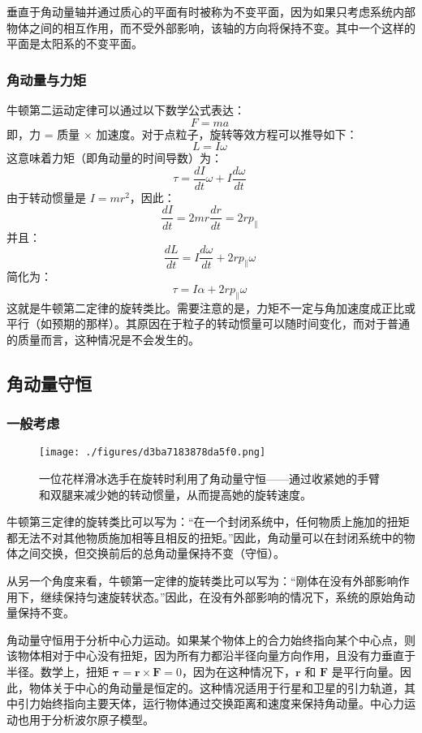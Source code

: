 垂直于角动量轴并通过质心的平面有时被称为不变平面，因为如果只考虑系统内部物体之间的相互作用，而不受外部影响，该轴的方向将保持不变。其中一个这样的平面是太阳系的不变平面。
\subsubsection{角动量与力矩}  
牛顿第二运动定律可以通过以下数学公式表达：
\[ F = ma ~\]
即，力 = 质量 × 加速度。对于点粒子，旋转等效方程可以推导如下：
\[ L = I\omega ~\]
这意味着力矩（即角动量的时间导数）为：
\[ \tau = \frac{dI}{dt} \omega + I\frac{d\omega}{dt} ~\]
由于转动惯量是 \( I = mr^2 \)，因此：
\[ \frac{dI}{dt} = 2mr\frac{dr}{dt} = 2rp_{\parallel} ~\]
并且：
\[ \frac{dL}{dt} = I\frac{d\omega}{dt} + 2rp_{\parallel} \omega ~\]
简化为：
\[ \tau = I\alpha + 2rp_{\parallel} \omega ~\]
这就是牛顿第二定律的旋转类比。需要注意的是，力矩不一定与角加速度成正比或平行（如预期的那样）。其原因在于粒子的转动惯量可以随时间变化，而对于普通的质量而言，这种情况是不会发生的。
\subsection{角动量守恒}
\subsubsection{一般考虑}
\begin{figure}[ht]
\centering
\texttt{[image: ./figures/d3ba7183878da5f0.png]}
\caption{一位花样滑冰选手在旋转时利用了角动量守恒——通过收紧她的手臂和双腿来减少她的转动惯量，从而提高她的旋转速度。} \label{fig_JDL_4}
\end{figure}
牛顿第三定律的旋转类比可以写为：“在一个封闭系统中，任何物质上施加的扭矩都无法不对其他物质施加相等且相反的扭矩。”因此，角动量可以在封闭系统中的物体之间交换，但交换前后的总角动量保持不变（守恒）。

从另一个角度来看，牛顿第一定律的旋转类比可以写为：“刚体在没有外部影响作用下，继续保持匀速旋转状态。”因此，在没有外部影响的情况下，系统的原始角动量保持不变。

角动量守恒用于分析中心力运动。如果某个物体上的合力始终指向某个中心点，则该物体相对于中心没有扭矩，因为所有力都沿半径向量方向作用，且没有力垂直于半径。数学上，扭矩 \(\boldsymbol{\tau} = \mathbf{r} \times \mathbf{F} = 0\)，因为在这种情况下，\(\mathbf{r}\) 和 \(\mathbf{F}\) 是平行向量。因此，物体关于中心的角动量是恒定的。这种情况适用于行星和卫星的引力轨道，其中引力始终指向主要天体，运行物体通过交换距离和速度来保持角动量。中心力运动也用于分析波尔原子模型。

